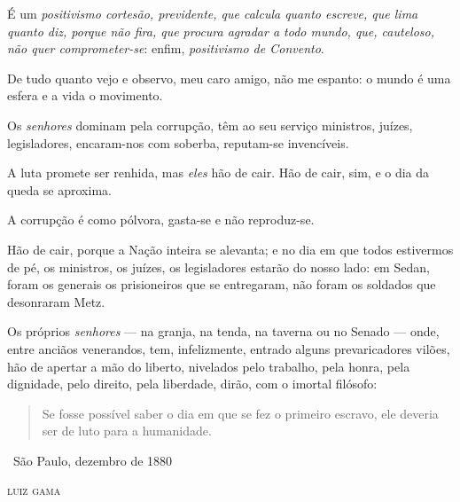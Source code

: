 É um \emph{positivismo cortesão, previdente, que calcula quanto escreve,
que lima quanto diz, porque não fira, que procura agradar a todo mundo,
que, cauteloso, não quer comprometer-se}: enfim, \emph{positivismo de
Convento}.

De tudo quanto vejo e observo, meu caro amigo, não me espanto: o mundo é
uma esfera e a vida o movimento.

Os \emph{senhores} dominam pela corrupção, têm ao seu serviço ministros,
juízes, legisladores, encaram-nos com soberba, reputam-se invencíveis.

A luta promete ser renhida, mas \emph{eles} hão de cair. Hão de cair,
sim, e o dia da queda se aproxima.

A corrupção é como pólvora, gasta-se e não reproduz-se.

Hão de cair, porque a Nação inteira se alevanta; e no dia em que todos
estivermos de pé, os ministros, os juízes, os legisladores estarão do
nosso lado: em Sedan, foram os generais os prisioneiros que se
entregaram, não foram os soldados que desonraram Metz.

Os próprios \emph{senhores} --- na granja, na tenda, na taverna ou no
Senado --- onde, entre anciãos venerandos, tem, infelizmente, entrado
alguns prevaricadores vilões, hão de apertar a mão do liberto, nivelados
pelo trabalho, pela honra, pela dignidade, pelo direito, pela liberdade,
dirão, com o imortal filósofo:

\begin{quote}
Se fosse possível saber o dia em que se fez o primeiro escravo,
ele deveria ser de luto para a humanidade.
\end{quote}

\medskip

\hfill\ São Paulo, dezembro de 1880

\hfill\textsc{luiz gama}


